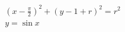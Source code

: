 \documentclass[brazilian]{article}
\begin{document}
\begin{gather}
    \left(x-\frac{\pi}{2}\right)^2 + \left(y-1+r\right)^2=r^2 \\
    y=\sin{x}
\end{gather}
\end{document}
